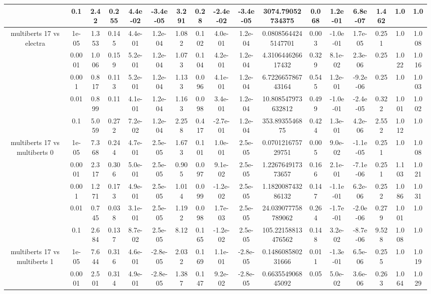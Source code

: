 \begin{tabular}{|c|c|c|c|c|c|c|c|c|c|c|c|c|c|c|c|c|}
 & 0.1 & 2.42 & 0.255 & 4.4e-02 & -3.4e-05 & 3.291 & 0.28 & -2.4e-02 & -3.4e-05 & 3074.79052734375 & 0.068 & 1.2e-01 & 6.8e-07 & 1.462 & 1.0 & 1.0 \\
\hline
\multirow{5}{*}{multiberts 17 vs electra } & 1e-05 & 1.353 & 0.145 & 4.4e-01 & 1.2e-04 & 1.082 & 0.102 & 4.0e-01 & 1.2e-04 & 0.08085644245147701 & 0.003 & -1.0e-01 & 1.7e-05 & 0.251 & 1.0 & 1.008 \\
 & 0.0001 & 1.006 & 0.159 & 5.2e-01 & 1.2e-04 & 1.073 & 0.104 & 4.2e-01 & 1.2e-04 & 4.310644626617432 & 0.329 & 8.1e-02 & 2.3e-06 & 0.25 & 1.022 & 1.016 \\
 & 0.001 & 0.817 & 0.113 & 5.2e-01 & 1.2e-04 & 1.133 & 0.096 & 4.1e-01 & 1.2e-04 & 6.722665786743164 & 0.545 & 1.2e-01 & -9.2e-06 & 0.25 & 1.0 & 1.003 \\
 & 0.01 & 0.899 & 0.11 & 4.1e-01 & 1.2e-04 & 1.163 & 0.098 & 3.4e-01 & 1.2e-04 & 10.808547973632812 & 0.499 & -1.0e-01 & -2.4e-05 & 0.322 & 1.001 & 1.002 \\
 & 0.1 & 5.059 & 0.272 & 7.2e-02 & 1.2e-04 & 2.258 & 0.417 & -2.7e-01 & 1.2e-04 & 353.8935546875 & 0.424 & 1.3e-01 & 4.2e-06 & 2.552 & 1.012 & 1.0 \\
\hline
\multirow{5}{*}{multiberts 17 vs multiberts 0} & 1e-05 & 7.368 & 0.244 & 4.7e-01 & 2.5e-05 & 1.673 & 0.101 & 1.0e-01 & 2.5e-05 & 0.070121675729751 & 0.005 & 9.0e-02 & -1.1e-05 & 0.251 & 1.0 & 1.008 \\
 & 0.0001 & 2.317 & 0.306 & 5.0e-01 & 2.5e-05 & 0.905 & 0.097 & 9.1e-02 & 2.5e-05 & 1.226764917373657 & 0.166 & 2.1e-01 & -7.1e-06 & 0.251 & 1.103 & 1.021 \\
 & 0.001 & 1.271 & 0.173 & 4.9e-01 & 2.5e-05 & 1.014 & 0.099 & -1.2e-02 & 2.5e-05 & 1.182008743286132 & 0.147 & -1.1e-01 & 6.2e-06 & 0.252 & 1.086 & 1.031 \\
 & 0.01 & 0.745 & 0.038 & 3.1e-01 & 2.5e-05 & 1.192 & 0.098 & 1.7e-03 & 2.5e-05 & 24.039077758789062 & 0.264 & -1.7e-01 & -2.0e-06 & 0.279 & 1.001 & 1.0 \\
 & 0.1 & 2.684 & 0.137 & 8.7e-02 & 2.5e-05 & 8.12 & 0.165 & -1.2e-02 & 2.5e-05 & 105.22158813476562 & 0.148 & 3.2e-02 & -8.7e-06 & 9.528 & 1.008 & 1.0 \\
\hline
\multirow{5}{*}{multiberts 17 vs multiberts 1} & 1e-05 & 7.644 & 0.316 & 4.6e-01 & -2.8e-05 & 2.032 & 0.169 & 1.1e-01 & -2.8e-05 & 0.148608580231666 & 0.011 & -1.3e-01 & 6.5e-06 & 0.255 & 1.0 & 1.019 \\
 & 0.0001 & 2.501 & 0.314 & 4.9e-01 & -2.8e-05 & 1.387 & 0.147 & 9.2e-02 & -2.8e-05 & 0.663554906845092 & 0.05 & 5.0e-02 & 3.6e-06 & 0.263 & 1.064 & 1.029 \\

\end{tabular}

